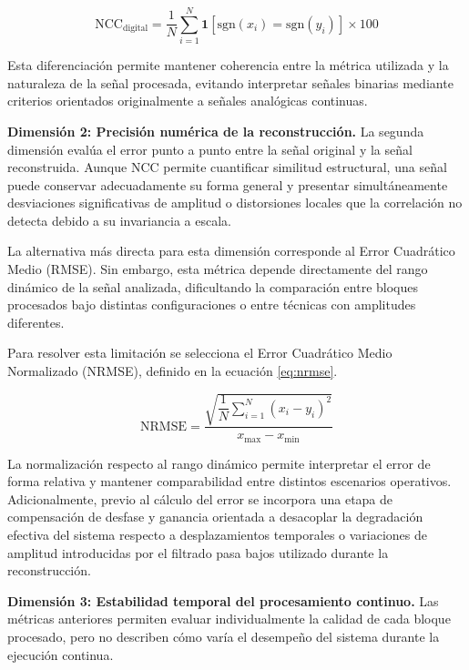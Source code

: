 \begin{equation}
\text{NCC}_{\text{digital}} = \frac{1}{N}\sum_{i=1}^{N}
\mathbf{1}\left[\text{sgn}(x_i) = \text{sgn}(y_i)\right] \times 100
\label{eq:ncc_digital}
\end{equation}

Esta diferenciación permite mantener coherencia entre la métrica utilizada y la naturaleza de la señal procesada, evitando interpretar señales binarias mediante criterios orientados originalmente a señales analógicas continuas.

\textbf{Dimensión 2: Precisión numérica de la reconstrucción.}  
La segunda dimensión evalúa el error punto a punto entre la señal original y la señal reconstruida. Aunque NCC permite cuantificar similitud estructural, una señal puede conservar adecuadamente su forma general y presentar simultáneamente desviaciones significativas de amplitud o distorsiones locales que la correlación no detecta debido a su invariancia a escala.

La alternativa más directa para esta dimensión corresponde al Error Cuadrático Medio (RMSE). Sin embargo, esta métrica depende directamente del rango dinámico de la señal analizada, dificultando la comparación entre bloques procesados bajo distintas configuraciones o entre técnicas con amplitudes diferentes.

Para resolver esta limitación se selecciona el Error Cuadrático Medio Normalizado (NRMSE), definido en la ecuación \ref{eq:nrmse}.

\begin{equation}
\text{NRMSE} = \frac{\sqrt{\dfrac{1}{N}\displaystyle\sum_{i=1}^{N}(x_i - y_i)^2}}
{x_{\max} - x_{\min}}
\label{eq:nrmse}
\end{equation}

La normalización respecto al rango dinámico permite interpretar el error de forma relativa y mantener comparabilidad entre distintos escenarios operativos. Adicionalmente, previo al cálculo del error se incorpora una etapa de compensación de desfase y ganancia orientada a desacoplar la degradación efectiva del sistema respecto a desplazamientos temporales o variaciones de amplitud introducidas por el filtrado pasa bajos utilizado durante la reconstrucción.

\textbf{Dimensión 3: Estabilidad temporal del procesamiento continuo.}  
Las métricas anteriores permiten evaluar individualmente la calidad de cada bloque procesado, pero no describen cómo varía el desempeño del sistema durante la ejecución continua.


